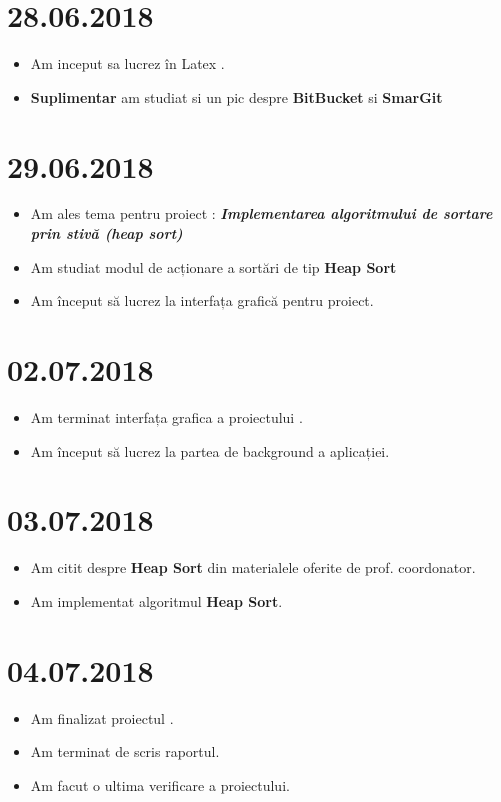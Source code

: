 \documentclass{report}
\begin{document}
\chapter{28.06.2018}
\begin{itemize}
    \item Am inceput sa lucrez în Latex .
    \item \textbf{Suplimentar} am studiat si un pic despre \textbf{BitBucket} si \textbf{SmarGit}
\end{itemize}

\chapter{29.06.2018}
\begin{itemize}
    \item Am ales tema pentru proiect : \textbf{\textit{Implementarea algoritmului de sortare prin stivă (heap sort)}} 
    \item Am studiat modul de acționare a sortări de tip \textbf{Heap Sort}
    \item Am început să lucrez la interfața grafică pentru proiect.
\end{itemize}
\chapter{02.07.2018}
\begin{itemize}
    \item Am terminat interfața grafica a proiectului .
    \item Am început să lucrez la partea de background a aplicației.
\end{itemize}
\chapter{03.07.2018}
\begin{itemize}
    \item Am citit despre \textbf{Heap Sort} din materialele oferite de prof. coordonator.
    \item Am implementat algoritmul \textbf{Heap Sort}.
\end{itemize}
\chapter{04.07.2018}
\begin{itemize}
    \item Am finalizat proiectul .
    \item Am terminat de scris raportul.
    \item Am facut o ultima verificare a proiectului.
\end{itemize}
\end{document}
